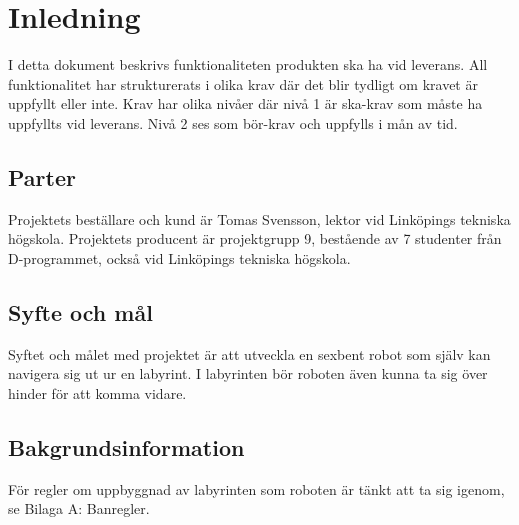 \documentclass[a4paper,titlepage,12pt]{article}
\begin{document}

	\newpage

	\section{Inledning}
	I detta dokument beskrivs funktionaliteten produkten ska ha vid leverans. All funktionalitet har strukturerats i olika krav där det 
	blir tydligt om kravet är uppfyllt eller inte. Krav har olika nivåer där
	nivå 1 är ska-krav som måste ha uppfyllts vid leverans. Nivå 2 ses som bör-krav 
	och uppfylls i mån av tid.

	\subsection{Parter}
	Projektets beställare och kund är Tomas Svensson, lektor vid Linköpings tekniska högskola.
	Projektets producent är projektgrupp 9, bestående av 7 studenter från D-programmet, också vid 
	Linköpings tekniska högskola.
	\subsection{Syfte och mål}
	Syftet och målet med projektet är att utveckla en sexbent robot som själv
	kan navigera sig ut ur en labyrint. I labyrinten bör roboten även kunna ta 
	sig över hinder för att komma vidare. 
	\subsection{Bakgrundsinformation}
	För regler om uppbyggnad av labyrinten som roboten är tänkt att ta sig igenom, se
	Bilaga A: Banregler.


  \newpage
\end{document}
